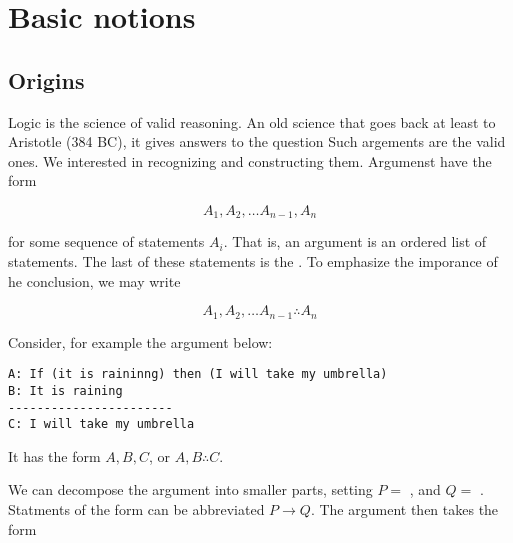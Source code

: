 \begin{mathmacro}
\newcommand{\set}[1]{\{ #1 \}}
\newcommand{\for}[0]{\mathcal{F}}
\newcommand{\axioms}[0]{\mathcal{A}}
\newcommand{\theorems}[0]{\mathcal{T}}
\end{mathmacro}

\section{Basic notions}

\innertableofcontents


\subsection{Origins}

Logic is the science of valid reasoning.  An old science that goes back at least to Aristotle (384 BC), it gives answers to the question  
Such argements are the valid ones.  We interested in recognizing and constructing them. Argumenst have the form

\begin{equation}
\label{argument}
A_1, A_2, \ldots A_{n-1}, A_n
\end{equation}

for some sequence of statements $A_i$.  That is, an argument is an ordered list of statements.  The last of these statements is the .  To emphasize the imporance of he conclusion, we may write

\begin{equation}
\label{argument2}
A_1, A_2, \ldots A_{n-1} \therefore A_n
\end{equation}

Consider, for example the argument below:

\begin{verbatim}
A: If (it is raininng) then (I will take my umbrella)
B: It is raining
-----------------------
C: I will take my umbrella
\end{verbatim}

It has the form $A, B, C$, or $A, B \therefore C$.

We can  decompose the argument into smaller parts, setting $P =$ , and $Q =$ .  Statments of the form  can be abbreviated $P \to Q$.  The argument then takes the form



